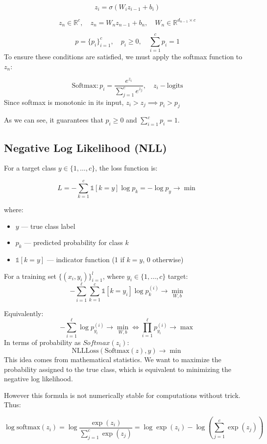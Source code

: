 \documentclass[12pt]{article}
\begin{document}
$$z_i = \sigma(W_i z_{i-1} + b_i)$$

$$z_n \in \mathbb{R}^c, \quad z_n = W_n z_{n-1} + b_n, \quad W_n \in \mathbb{R}^{d_{n-1} \times c}$$

$$p = \{p_i\}_{i=1}^{c}, \quad p_i \geq 0, \quad \sum_{i=1}^{c} p_i = 1$$
To ensure these conditions are satisfied, we must apply the softmax function to $z_n$:

$$\text{Softmax}: p_i = \frac{e^{z_i}}{\sum_{j=1}^{c} e^{z_j}}, \quad z_i - \text{logits}$$
Since softmax is monotonic in its input, 
$z_i > z_j \implies p_i > p_j$


As we can see, it guarantees that $p_i \geq 0$ and $\sum_{i=1}^{c} p_i = 1$.

\subsection{Negative Log Likelihood (NLL)}

For a target class $y \in \{1, \ldots, c\}$, the loss function is:

$$L = -\sum_{k=1}^{c} \mathbb{1}[k = y] \log p_k = -\log p_y \longrightarrow \min$$

where:
\begin{itemize}
  \item $y$ — true class label
  \item $p_k$ — predicted probability for class $k$
  \item $\mathbb{1}[k = y]$ — indicator function (1 if $k = y$, 0 otherwise)
\end{itemize}

For a training set $\{(x_i, y_i)\}_{i=1}^{l}$, where $y_i \in \{1, \ldots, c\}$ target:
$$ -\sum_{i=1}^{\ell} \sum_{k=1}^{c} \mathbb{1}[k = y_i] \log p_k^{(i)} \longrightarrow \min_{W,b} $$

Equivalently:
$$-\sum_{i=1}^{\ell} \log p_{y_i}^{(i)} \longrightarrow \min_{W,b} \iff \prod_{i=1}^{\ell} p_{y_i}^{(i)} \longrightarrow \max$$
In terms of probability as $Softmax(z_i)$: 
$$\text{NLLLoss}(\text{Softmax}(z), y) \longrightarrow \min$$
This idea comes from mathematical statistics. We want to maximize the probability assigned to the true class, which is equivalent to minimizing the negative log likelihood.

However this formula is not numerically stable for computations without trick. Thus:

$$\log \text{softmax}(z_i) = \log \frac{\exp(z_i)}{\sum_{j=1}^{c} \exp(z_j)} = \log \exp(z_i) - \log \left(\sum_{j=1}^{c} \exp(z_j)\right)$$
\end{document}
